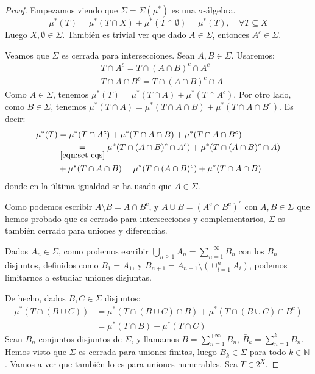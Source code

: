   \begin{proof}
   Empezamos viendo que $\Sigma = \Sigma(\mu^\ast)$ es una $\sigma$-álgebra.
   \[
     \mu^\ast(T) = \mu^\ast(T\cap X) + \mu^\ast(T\cap \emptyset) = \mu^\ast(T), \quad \forall T\subseteq X
   \]
   Luego $X,\emptyset \in \Sigma$. También es trivial ver que dado $A\in \Sigma$, entonces $A^c \in \Sigma$.
   
   Veamos que $\Sigma$ es cerrada para intersecciones. Sean $A, B\in \Sigma$. Usaremos:
   \begin{align}
    & T\cap A^c = T\cap (A\cap B)^c \cap A^c \nonumber\\
    & T\cap A \cap B^c = T \cap (A\cap B)^c \cap A
    \label{eqn:set-eqs}\tag{$\ast$}
   \end{align}
   Como $A\in \Sigma$, tenemos $\mu^\ast(T) = \mu^\ast(T\cap A) + \mu^\ast(T\cap A^c)$. 
   Por otro lado, como $B\in \Sigma$, tenemos $\mu^\ast(T\cap A) = \mu^\ast(T\cap A\cap B) + \mu^\ast(T\cap A \cap B^c)$. 
   Es decir:
   \begin{align*}
    \mu^\ast(T) &= \mu^\ast(T\cap A^c) + \mu^\ast(T\cap A \cap B) + \mu^\ast(T\cap A \cap B^c)\\
    & \underset{\eqref{eqn:set-eqs}}{=} \mu^\ast(T\cap (A\cap B)^c \cap A^c) + \mu^\ast(T \cap (A\cap B)^c \cap A)\\
    &+ \mu^\ast(T\cap A \cap B) = \mu^\ast(T\cap (A \cap B)^c) + \mu^\ast(T\cap A \cap B)
   \end{align*}
   donde en la última igualdad se ha usado que $A\in \Sigma$.
   
   Como podemos escribir $A\setminus B = A\cap B^c$, y $A\cup B = (A^c \cap B^c)^c$ con $A, B \in \Sigma$ que
   hemos probado que es cerrado para intersecciones y complementarios, $\Sigma$ es también cerrado para
   uniones y diferencias.
   
   Dados $A_n \in \Sigma$, como podemos escribir $\bigcup_{n\ge 1} A_n = \sum_{n=1}^{+\infty} B_n$ con los $B_n$ 
   disjuntos, definidos como $B_1 = A_1$, y $B_{n+1} = A_{n+1} \setminus\left(\cup_{i=1}^n A_i\right)$, 
   podemos limitarnos a estudiar uniones disjuntas.
   
   De hecho, dados $B,C \in \Sigma$ disjuntos:
   \begin{align*}
    \mu^\ast(T \cap (B\cup C)) &= \mu^\ast(T \cap(B\cup C) \cap B) + \mu^\ast(T \cap(B\cup C) \cap B^c)\\
                               &= \mu^\ast(T \cap B) + \mu^\ast(T \cap C)
   \end{align*}
   Sean $B_n$ conjuntos disjuntos de $\Sigma$, y llamamos $B = \sum_{n=1}^{+\infty} B_n$, $\bar{B}_k = \sum_{n=1}^{k} B_n$.
   Hemos visto que $\Sigma$ es cerrada para uniones finitas, luego $\bar{B}_k \in \Sigma$ para todo $k\in \mathbb{N}$.
   Vamos a ver que también lo es para uniones numerables. Sea $T\in 2^X$.


\end{proof}
